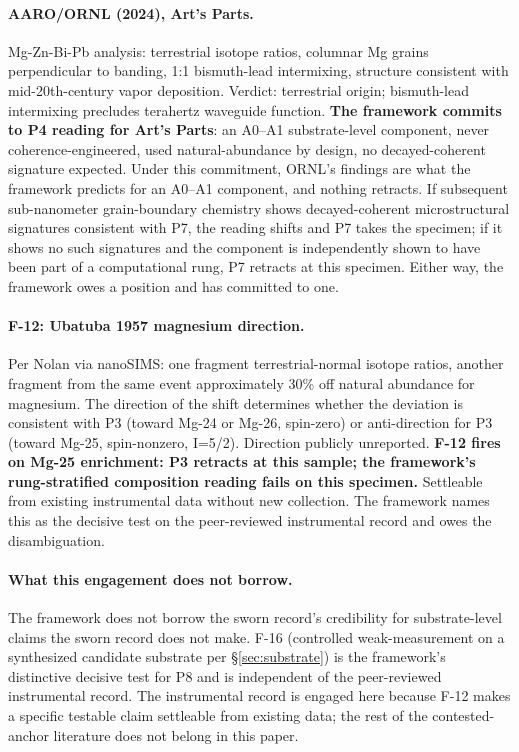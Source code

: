 \documentclass[11pt,a4paper]{article}
\begin{document}
\paragraph{AARO/ORNL (2024), Art's Parts.} Mg-Zn-Bi-Pb analysis: terrestrial isotope ratios, columnar Mg grains perpendicular to banding, 1:1 bismuth-lead intermixing, structure consistent with mid-20th-century vapor deposition. Verdict: terrestrial origin; bismuth-lead intermixing precludes terahertz waveguide function. \textbf{The framework commits to P4 reading for Art's Parts}: an A0--A1 substrate-level component, never coherence-engineered, used natural-abundance by design, no decayed-coherent signature expected. Under this commitment, ORNL's findings are what the framework predicts for an A0--A1 component, and nothing retracts. If subsequent sub-nanometer grain-boundary chemistry shows decayed-coherent microstructural signatures consistent with P7, the reading shifts and P7 takes the specimen; if it shows no such signatures and the component is independently shown to have been part of a computational rung, P7 retracts at this specimen. Either way, the framework owes a position and has committed to one.

\paragraph{F-12: Ubatuba 1957 magnesium direction.} Per Nolan via nanoSIMS: one fragment terrestrial-normal isotope ratios, another fragment from the same event approximately 30\% off natural abundance for magnesium. The direction of the shift determines whether the deviation is consistent with P3 (toward Mg-24 or Mg-26, spin-zero) or anti-direction for P3 (toward Mg-25, spin-nonzero, I=5/2). Direction publicly unreported. \textbf{F-12 fires on Mg-25 enrichment: P3 retracts at this sample; the framework's rung-stratified composition reading fails on this specimen.} Settleable from existing instrumental data without new collection. The framework names this as the decisive test on the peer-reviewed instrumental record and owes the disambiguation.

\paragraph{What this engagement does not borrow.} The framework does not borrow the sworn record's credibility for substrate-level claims the sworn record does not make. F-16 (controlled weak-measurement on a synthesized candidate substrate per \S\ref{sec:substrate}) is the framework's distinctive decisive test for P8 and is independent of the peer-reviewed instrumental record. The instrumental record is engaged here because F-12 makes a specific testable claim settleable from existing data; the rest of the contested-anchor literature does not belong in this paper.
\end{document}
